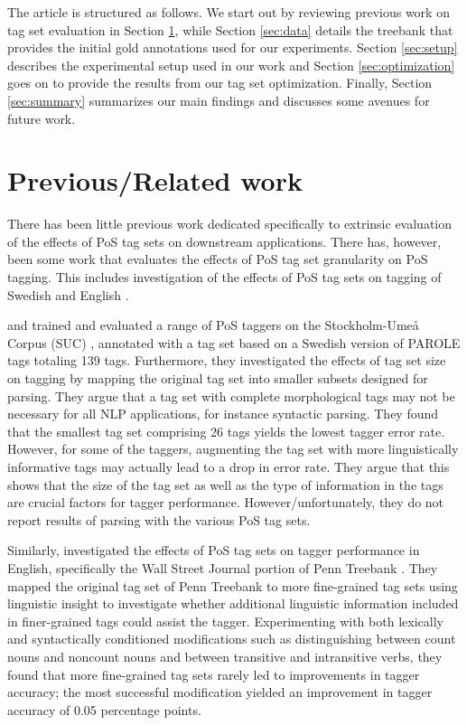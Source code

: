 \documentclass[11pt,a4paper]{article}
\begin{document}
The article is structured as follows. We start out by reviewing
previous work on tag set evaluation in Section \ref{sec:prev}, while
Section \ref{sec:data} details the treebank that provides the initial gold
annotations used for our experiments. Section \ref{sec:setup} describes the experimental
setup used in our work and Section \ref{sec:optimization} goes on to
provide the results from our tag set optimization. Finally,
Section \ref{sec:summary} summarizes our main findings and discusses
some avenues for future work.

\section{Previous/Related work}
\label{sec:prev}
There has been little previous work dedicated specifically to
extrinsic evaluation of the effects of PoS tag sets on downstream
applications.  There has, however, been some work that evaluates the
effects of PoS tag set granularity on PoS tagging. This includes
investigation of the effects of PoS tag sets on tagging of Swedish
\cite{Meg:01,Meg:02} and English \cite{Mac:05}.


 and  trained and evaluated a range of PoS
taggers on the Stockholm-Umeå Corpus (SUC) \cite{Gus:Har:06}, annotated with a
tag set based on a Swedish version of PAROLE tags totaling 139 tags.
Furthermore, they investigated the effects of tag set size on tagging by
mapping the original tag set into smaller subsets designed for parsing. They
argue that a tag set with complete morphological tags may not be necessary for
all NLP applications, for instance syntactic parsing. They found that the
smallest tag set comprising 26 tags yields the lowest tagger error rate.
However, for some of the taggers, augmenting the tag set with more
linguistically informative tags may actually lead to a drop in error rate. They
argue that this shows that the size of the tag set as well as the type of
information in the tags are crucial factors for tagger performance.
However/unfortunately, they do not report results of parsing with the various
PoS tag sets.

Similarly,  investigated the effects of PoS tag sets on tagger
performance in English, specifically the Wall Street Journal portion of Penn
Treebank \cite{Mar:San:Mar:93}. They mapped the original tag set of Penn
Treebank to more fine-grained tag sets using linguistic insight to investigate
whether additional linguistic information included in finer-grained tags could
assist the tagger. Experimenting with both lexically and syntactically
conditioned modifications such as distinguishing between count nouns and
noncount nouns and between transitive and intransitive verbs, they found that
more fine-grained tag sets rarely led to improvements in tagger accuracy; the
most successful modification yielded an improvement in tagger accuracy of 0.05
percentage points.
\end{document}

